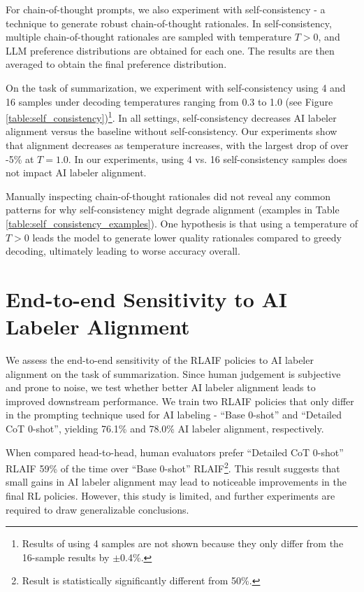\documentclass[11pt]{article}
\begin{document}
For chain-of-thought prompts, we also experiment with self-consistency \citep{wang2022self} - a technique to generate robust chain-of-thought rationales. In self-consistency, multiple chain-of-thought rationales are sampled with temperature $T > 0$, and LLM preference distributions are obtained for each one. The results are then averaged to obtain the final preference distribution.

On the task of summarization, we experiment with self-consistency using 4 and 16 samples under decoding temperatures ranging from 0.3 to 1.0 (see Figure \ref{table:self_consistency})\footnote{Results of using 4 samples are not shown because they only differ from the 16-sample results by $\pm$0.4\%.}. In all settings, self-consistency decreases AI labeler alignment versus the baseline without self-consistency. Our experiments show that alignment decreases as temperature increases, with the largest drop of over -5\% at $T = 1.0$. In our experiments, using 4 vs. 16 self-consistency samples does not impact AI labeler alignment.

Manually inspecting chain-of-thought rationales did not reveal any common patterns for why self-consistency might degrade alignment (examples in Table \ref{table:self_consistency_examples}). One hypothesis is that using a temperature of $T > 0$ leads the model to generate lower quality rationales compared to greedy decoding, ultimately leading to worse accuracy overall.


\section{End-to-end Sensitivity to AI Labeler Alignment}
\label{sec:e2e_sensitivity}
We assess the end-to-end sensitivity of the RLAIF policies to AI labeler alignment on the task of summarization. Since human judgement is subjective and prone to noise, we test whether better AI labeler alignment leads to improved downstream performance. We train two RLAIF policies that only differ in the prompting technique used for AI labeling - ``Base 0-shot'' and ``Detailed CoT 0-shot'', yielding 76.1\% and 78.0\% AI labeler alignment, respectively.

When compared head-to-head, human evaluators prefer ``Detailed CoT 0-shot'' RLAIF 59\% of the time over ``Base 0-shot'' RLAIF\footnote{Result is statistically significantly different from 50\%.}. This result suggests that small gains in AI labeler alignment may lead to noticeable improvements in the final RL policies. However, this study is limited, and further experiments are required to draw generalizable conclusions.
\end{document}
